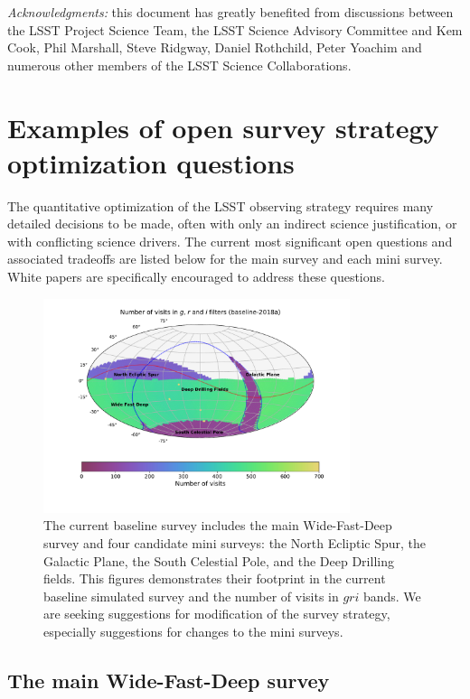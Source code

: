 \documentclass[DM,lsstdraft,toc,usenatbib]{lsstdoc}
\begin{document}
\vskip 0.2in 
{\it Acknowledgments:} this document has greatly benefited from discussions between 
the LSST Project Science Team, the LSST Science Advisory Committee and Kem Cook, 
Phil Marshall, Steve Ridgway, Daniel Rothchild, Peter Yoachim and numerous other members 
of the LSST Science Collaborations. 

\newpage
\appendix
\section{Examples of open survey strategy optimization questions \label{sec:optimization}} 

The quantitative optimization of the LSST observing strategy requires many 
detailed decisions to be made, often with only an indirect science justification,
or with conflicting science drivers.  The current most significant open questions and associated 
tradeoffs are listed below for the main survey and each mini survey. White papers are specifically 
encouraged to address these questions.

\begin{figure}[htb]
\centering
\includegraphics[width=0.8\textwidth]{Nvisits_gri}
\caption{The current baseline survey includes the main Wide-Fast-Deep survey and four candidate mini surveys:
the North Ecliptic Spur, the Galactic Plane, the South Celestial Pole, and the Deep Drilling fields. This figures
demonstrates their footprint in the current baseline simulated survey and the number of visits in $gri$ bands.
We are seeking suggestions for modification of the survey strategy, especially suggestions for changes to the
mini surveys.}
\end{figure}

\subsection{The main Wide-Fast-Deep survey} 
\end{document}
